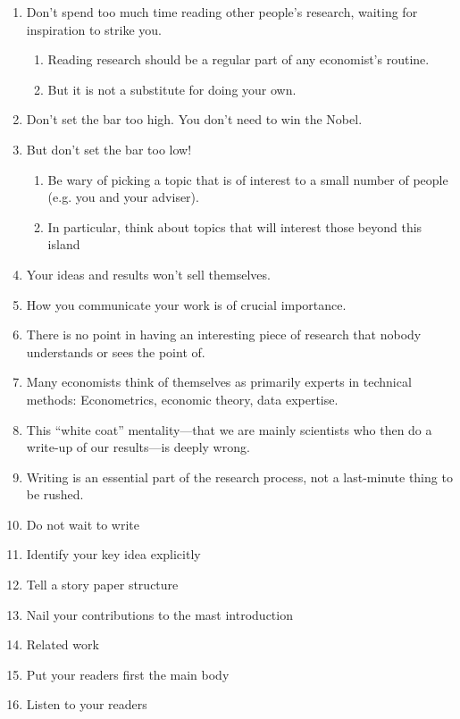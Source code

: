\begin{enumerate}
	\item  Don’t spend too much time reading other people’s research, waiting for inspiration to strike you.
	      \begin{enumerate}
		      \item  Reading research should be a regular part of any economist’s routine.
		      \item But it is not a substitute for doing your own.
	      \end{enumerate}

	\item Don’t set the bar too high. You don’t need to win the Nobel.
	\item  But don’t set the bar too low!
	      \begin{enumerate}
		      \item Be wary of picking a topic that is of interest to a small number of people (e.g. you and your adviser).
		      \item In particular, think about topics that will interest those beyond this island
	      \end{enumerate}
	\item Your ideas and results won’t sell themselves.
	\item How you communicate your work is of crucial importance.
	\item There is no point in having an interesting piece of research that nobody understands or sees the point of.
	\item Many economists think of themselves as primarily experts in technical methods: Econometrics, economic theory, data expertise.
	\item This “white coat” mentality—that we are mainly scientists who then do a write-up of our results—is deeply wrong.
	\item Writing is an essential part of the research process, not a last-minute thing to be rushed.
	\item Do not wait to write
	\item Identify your key idea explicitly
	\item Tell a story paper structure
	\item Nail your contributions to the mast  introduction
	\item Related work
	\item Put your readers first the main body
	\item Listen to your readers
\end{enumerate}

